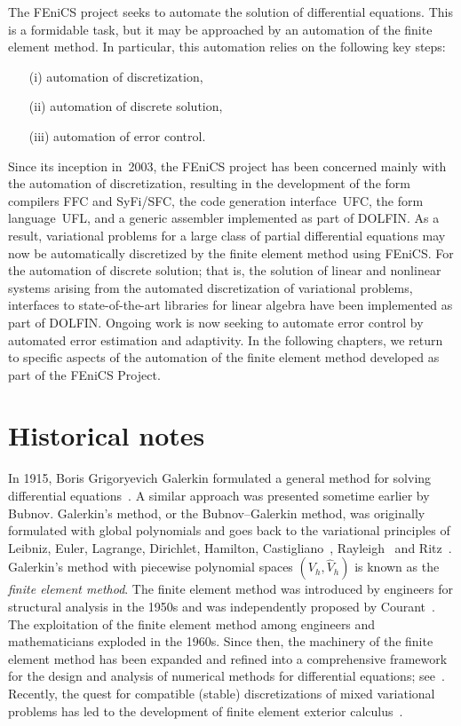 The FEniCS project seeks to automate the solution of differential
equations. This is a formidable task, but it may be approached by an
automation of the finite element method. In particular, this
automation relies on the following key steps:
\begin{itemize}
\item[(i)]
  automation of discretization,
\item[(ii)]
  automation of discrete solution,
\item[(iii)]
  automation of error control.
\end{itemize}
Since its inception in~2003, the FEniCS project has been concerned
mainly with the automation of discretization, resulting in the
development of the form compilers FFC and SyFi/SFC, the code
generation interface~UFC, the form language~UFL, and a generic
assembler implemented as part of DOLFIN. As a result, variational
problems for a large class of partial differential equations may now
be automatically discretized by the finite element method using
FEniCS. For the automation of discrete solution; that is, the solution
of linear and nonlinear systems arising from the automated
discretization of variational problems, interfaces to state-of-the-art
libraries for linear algebra have been implemented as part of
DOLFIN. Ongoing work is now seeking to automate error control by
automated error estimation and adaptivity. In the following chapters,
we return to specific aspects of the automation of the finite element
method developed as part of the FEniCS Project.

\section{Historical notes}

In 1915, Boris Grigoryevich Galerkin formulated a general method for
solving differential equations~\citep{Galerkin1915}. A similar
approach was presented sometime earlier by Bubnov. Galerkin's method,
or the Bubnov--Galerkin method, was originally formulated with global
polynomials and goes back to the variational principles of Leibniz,
Euler, Lagrange, Dirichlet, Hamilton,
Castigliano~\citep{Castigliano1879}, Rayleigh~\citep{Rayleigh1870} and
Ritz~\citep{Ritz1908}. Galerkin's method with piecewise polynomial
spaces $(V_h, \hat{V}_h)$ is known as the \emph{finite element
  method}. The finite element method was introduced by engineers for
structural analysis in the 1950s and was independently proposed by
Courant~\citep{Courant1943}. The exploitation of the finite element
method among engineers and mathematicians exploded in the 1960s. Since
then, the machinery of the finite element method has been expanded and
refined into a comprehensive framework for the design and analysis of
numerical methods for differential equations;
see~\citet{ZienkiewiczTaylorZhu2005firstpublishedin1967,StrangFix1973,Ciarlet1976,BeckerCareyOden1981,Hughes1987,BrennerScott2008}.
Recently, the quest for compatible (stable) discretizations of mixed
variational problems has led to the development of finite element
exterior calculus~\citep{ArnoldFalkWinther2006}.

